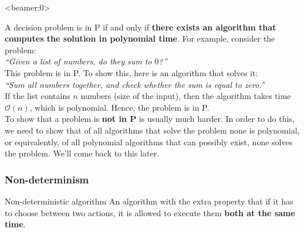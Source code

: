\documentclass[handout, 12pt]{beamer}
\newcommand{\bigo}[1]{\mathcal{O}\mathopen{}\left(#1\right)\mathclose{}}
\begin{document}
\begin{frame}<beamer:0>

\footnotesize
A decision problem is in P if and only if \textbf{there exists an algorithm that computes the solution in polynomial time}. For example, consider the problem:
\\[0.6em]
\textit{``Given a list of numbers, do they sum to $0$?''}
\\[0.6em]
This problem is in P. To show this, here is an algorithm that solves it:
\\[0.6em]
\textit{``Sum all numbers together, and check whether the sum is equal to zero.''}
\\[0.6em]
If the list contains $n$ numbers (size of the input), then the algorithm takes time $\bigo{n}$, which is polynomial. Hence, the problem is in P.
\\[0.6em]
To show that a problem is \textbf{not in P} is usually much harder. In order to do this, we need to show that of all algorithms that solve the problem none is polynomial, or equivalently, of all polynomial algorithms that can possibly exist, none solves the problem. We'll come back to this later.

\end{frame}

\begin{frame}

\frametitle{Non-determinism}

\begin{block}{Non-deterministic algorithm}
An algorithm with the extra property that if it has to choose between two actions, it is allowed to execute them \textbf{both at the same time}.
\end{block}

\end{frame}
\end{document}
